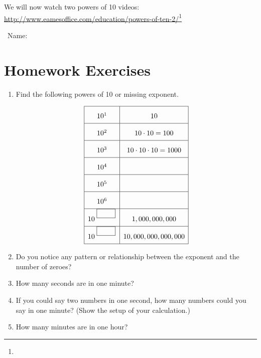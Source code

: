 \documentclass{article}
\begin{document}
We will now watch two powers of 10 videos: \url{http://www.eamesoffice.com/education/powers-of-ten-2/}\footnote{\hphantom{ab} }

\mynewpage

\ \hfill Name: \underline{\hspace{1.5in}}

\section*{Homework Exercises}

\begin{enumerate}
\item Find the following powers of 10 or missing exponent.

  \begin{equation*}
    \renewcommand{\arraystretch}{2}
    \begin{array}{|c|c|}
      \hline 10^1 & 10\\
      \hline 10^2 & 10\cdot 10 = 100\\
      \hline 10^3 & 10\cdot 10\cdot 10 = 1000\\
      \hline 10^4 & \\
      \hline 10^5 & \\
      \hline 10^6 & \\
      \hline 10^{{\text{\ }}^{\fbox{\phantom{1000}}}} & 1,000,000,000\\
      \hline 10^{{\text{\ }}^{\fbox{\phantom{1000}}}} & 10,000,000,000,000\\
      \hline
    \end{array}
  \end{equation*}
\item Do you notice any pattern or relationship between the exponent and the number of zeroes?

  \vfill
  
\item How many seconds are in one minute?

  \vfill
  
\item If you could say two numbers in one second, how many numbers could you say in one minute? (Show the setup of your calculation.)

  \vfill
  
\item How many minutes are in one hour?

  \vfill
  

\end{enumerate}
\end{document}
